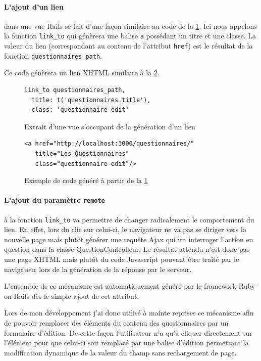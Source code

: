 \documentclass[12pt,a4paper]{book}
\begin{document}
\paragraph{L'ajout d'un lien} dans une vue Rails se fait d'une façon similaire au code de la \cref{fig.link}. Ici nous appelons la fonction \texttt{link\_to} qui génèrera une balise \texttt{a} possédant un titre et une classe. La valeur du lien (correspondant au contenu de l'attribut \texttt{href}) est le résultat de la fonction \texttt{questionnaires\_path}.

Ce code génèrera un lien XHTML similaire à la \cref{fig.link2}.

\begin{figure}[h]
\lstset{language=ruby}
\begin{lstlisting}
link_to questionnaires_path, 
  title: t('questionnaires.title'), 
  class: 'questionnaire-edit'
\end{lstlisting}
 \caption{Extrait d'une vue s'occupant de la génération d'un lien}
 \label{fig.link}
\end{figure}

\begin{figure}[h]
\lstset{language=xml}
\begin{lstlisting}
<a href="http://localhost:3000/questionnaires/" 
   title="Les Questionnaires" 
   class="questionnaire-edit"/>
\end{lstlisting}
 \caption{Exemple de code généré à partir de la \cref{fig.link}}
 \label{fig.link2}
\end{figure}

\paragraph{L'ajout du paramètre \texttt{remote}} à la fonction \texttt{link\_to} va permettre de changer radicalement le comportement du lien. En effet, lors du clic sur celui-ci, le navigateur ne va pas se diriger vers la nouvelle page mais plutôt générer une requête Ajax qui ira interroger l'action en question dans la classe QuestionControlleur. Le résultat attendu n'est donc pas une page XHTML mais plutôt du code Javascript pouvant être traité par le navigateur lors de la génération de la réponse par le serveur.

L'ensemble de ce mécanisme est automatiquement généré par le framework Ruby on Rails dès le simple ajout de cet attribut.

Lors de mon développement j'ai donc utilisé à mainte reprises ce mécanisme afin de pouvoir remplacer des éléments du contenu des questionnaires par un formulaire d'édition. De cette façon l'utilisateur n'a qu'à cliquer directement sur l'élément pour que celui-ci soit remplacé par une balise d'édition permettant la modification dynamique de la valeur du champ sans rechargement de page.  
\end{document}

